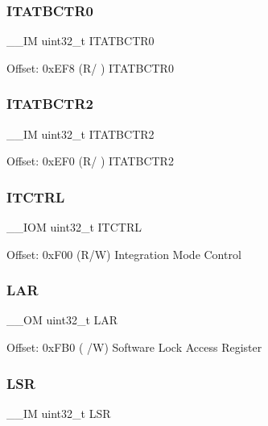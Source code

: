 \subsubsection{\texorpdfstring{ITATBCTR0}{ITATBCTR0}}
{\footnotesize\ttfamily \+\_\+\+\_\+\+IM uint32\+\_\+t I\+T\+A\+T\+B\+C\+T\+R0}

Offset\+: 0x\+E\+F8 (R/ ) I\+T\+A\+T\+B\+C\+T\+R0 \mbox{\label{struct_t_p_i___type_a97fb8816ad001f4910de095aa17d9db5}} 
\subsubsection{\texorpdfstring{ITATBCTR2}{ITATBCTR2}}
{\footnotesize\ttfamily \+\_\+\+\_\+\+IM uint32\+\_\+t I\+T\+A\+T\+B\+C\+T\+R2}

Offset\+: 0x\+E\+F0 (R/ ) I\+T\+A\+T\+B\+C\+T\+R2 \mbox{\label{struct_t_p_i___type_ae6b7f224b1c19c636148f991cc8db611}} 
\subsubsection{\texorpdfstring{ITCTRL}{ITCTRL}}
{\footnotesize\ttfamily \+\_\+\+\_\+\+I\+OM uint32\+\_\+t I\+T\+C\+T\+RL}

Offset\+: 0x\+F00 (R/W) Integration Mode Control \mbox{\label{struct_t_p_i___type_acc9e51f871c357a9094105435b150d13}} 
\subsubsection{\texorpdfstring{LAR}{LAR}}
{\footnotesize\ttfamily \+\_\+\+\_\+\+OM uint32\+\_\+t L\+AR}

Offset\+: 0x\+F\+B0 ( /W) Software Lock Access Register \mbox{\label{struct_t_p_i___type_a7219432d03f6cd1d220f4fe10aef4880}} 
\subsubsection{\texorpdfstring{LSR}{LSR}}
{\footnotesize\ttfamily \+\_\+\+\_\+\+IM uint32\+\_\+t L\+SR}

